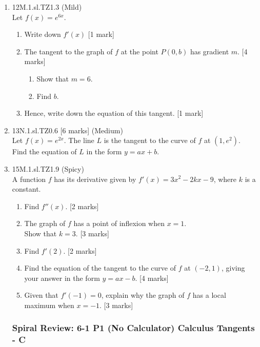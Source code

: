 \documentclass[12pt, twoside]{article}
\begin{document}
\begin{enumerate}
  \item 12M.1.sl.TZ1.3 (Mild)\\
  Let $f(x)=e^{6x}$.
  \begin{enumerate}
    \item Write down $f'(x)$ [1 mark]
    \item The tangent to the graph of $f$ at the point $P(0,b)$ has gradient $m$.  [4 marks]
    \begin{enumerate}
      \item Show that $m=6$.
      \item Find $b$.
    \end{enumerate}
    \item Hence, write down the equation of this tangent. [1 mark]
  \end{enumerate}

\vspace{2cm}
  \item 13N.1.sl.TZ0.6 [6 marks] (Medium)\\
  Let $f(x)=e^{2x}$. The line $L$ is the tangent to the curve of $f$ at $(1,e^2)$.\\
  Find the equation of $L$ in the form $y=ax+b$.

\vspace{2cm}
  \item 15M.1.sl.TZ1.9 (Spicy)\\
  A function $f$ has its derivative given by $f'(x)=3x^2-2kx-9$, where $k$ is a constant.
  \begin{enumerate}
    \item Find $f''(x)$. [2 marks]
    \item The graph of $f$ has a point of inflexion when $x=1$.\\
    Show that $k=3$. [3 marks]
    \item Find $f'(2)$. [2 marks]
    \item Find the equation of the tangent to the curve of $f$ at $(-2,1)$, giving your answer in the form  $y=ax-b$. [4 marks]
    \item Given that $f'(-1)=0$, explain why the graph of $f$ has a local maximum when $x=-1$. [3 marks]
  \end{enumerate}


\newpage
\setcounter{enumi}{0}
\subsubsection*{Spiral Review: 6-1 P1 (No Calculator) Calculus Tangents - C}



\end{enumerate}
\end{document}
